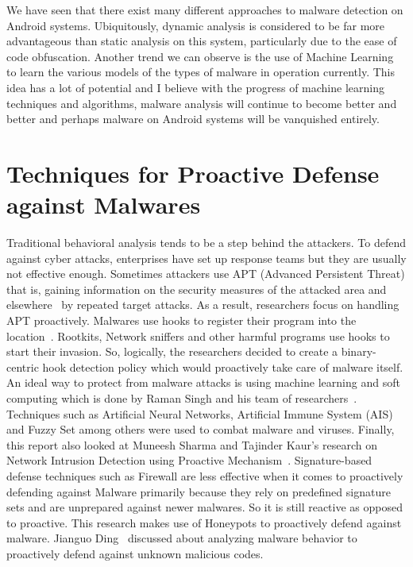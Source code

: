 \documentclass[11pt]{article}
\begin{document}
	We have seen that there exist many different approaches to malware detection on Android systems. Ubiquitously, dynamic analysis is considered to be far more advantageous than static analysis on this system, particularly due to the ease of code obfuscation. Another trend we can observe is the use of Machine Learning to learn the various models of the types of malware in operation currently. This idea has a lot of potential and I believe with the progress of machine learning techniques and algorithms, malware analysis will continue to become better and better and perhaps malware on Android systems will be vanquished entirely.

	\section{Techniques for Proactive Defense against Malwares}
	
	Traditional behavioral analysis tends to be a step behind the attackers. To defend against cyber attacks, enterprises have set up response teams but they are usually not effective enough. Sometimes attackers use APT (Advanced Persistent Threat) that is, gaining information on the security measures of the attacked area and elsewhere~\cite{cyberthreatanalysis} by repeated target attacks. As a result, researchers focus on handling APT proactively. Malwares use hooks to register their program into the location~\cite{hookscout}. Rootkits, Network sniffers and other harmful programs use hooks to start their invasion. So, logically, the researchers decided to create a binary-centric hook detection policy which would proactively take care of malware itself. An ideal way to protect from malware attacks is using machine learning and soft computing which is done by Raman Singh and his team of researchers~\cite{softcomputingproactive}. Techniques such as Artificial Neural Networks, Artificial Immune System (AIS) and Fuzzy Set among others were used to combat malware and viruses.  Finally, this report also looked at Muneesh Sharma and Tajinder Kaur’s research on Network Intrusion Detection using Proactive Mechanism~\cite{nidsproactive}. Signature-based defense techniques such as Firewall are less effective when it comes to proactively defending against Malware primarily because they rely on predefined signature sets and are unprepared against newer malwares. So it is still reactive as opposed to proactive. This research makes use of Honeypots to proactively defend against malware. Jianguo Ding~\cite{behaviorbasedproactive} discussed about analyzing malware behavior to proactively defend against unknown malicious codes. \\
	
\end{document}
